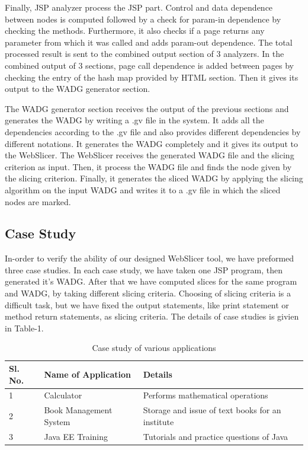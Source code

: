 \documentclass[11pt]{article}   %
\begin{document}
Finally, JSP analyzer process the JSP part. Control and data dependence between nodes is computed followed by a check for param-in dependence by checking the methods. Furthermore, it also checks if a page returns any parameter from which it was called and adds param-out dependence. The total processed result is sent to the combined output section of 3 analyzers. In the combined output of 3 sections, page call dependence is added between pages by checking the entry of the hash map provided by HTML section. Then it gives its output to the WADG generator section.

The WADG generator section receives the output of the previous sections and generates the WADG by writing a .gv file in the system. It adds all the dependencies according to the .gv file and also provides different dependencies by different notations. It generates the WADG completely and it gives its output to the WebSlicer. The WebSlicer receives the generated WADG file and the slicing criterion as input. Then, it process the WADG file and finds the node given by the slicing criterion. Finally, it generates the sliced WADG by applying the slicing algorithm on the input WADG and writes it to a .gv file in which the sliced nodes are marked.

\subsection{Case Study}

In-order to verify the ability of our designed WebSlicer tool, we have preformed three case studies. In each case study, we have taken one JSP program, then generated it's WADG. After that we have computed slices for the same program and WADG, by taking different slicing criteria. Choosing of slicing criteria is a difficult task, but we have fixed the output statements, like print statement or method return statements, as slicing criteria. The details of case studies is givien in Table-1. 

\begin{table}[htb]
 \centering
  \caption{Case study of various applications}
\label{tab1}
{ 
 \begin{tabular}{|p{.4cm}|l|l|}
 \hline  \bf{Sl. No.} & \bf{Name of Application}& \bf{Details}\\
 \hline  {1} & {Calculator} & {Performs mathematical operations} \\
 \hline  {2} & {Book Management System} & {Storage and issue of text books for an institute} \\
\hline  {3} & {Java EE Training} & {Tutorials and practice questions of Java} \\     
 \hline         
          \end{tabular}
 }
 \end{table}
\end{document}
